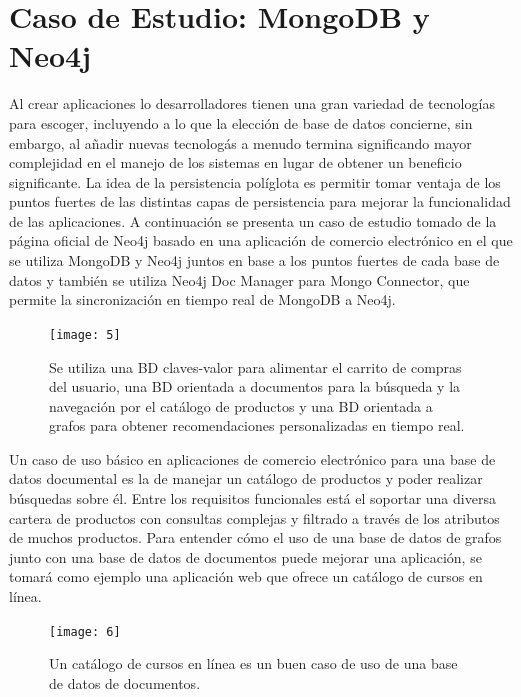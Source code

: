 \documentclass[conference]{IEEEtran}
\begin{document}
\section{Caso de Estudio: MongoDB y Neo4j}
Al crear aplicaciones lo desarrolladores tienen una gran variedad de tecnolog\'ias para escoger, incluyendo a lo que la elecci\'on de base de datos  concierne, sin embargo, al a\~nadir nuevas tecnolog\'as a menudo termina significando mayor complejidad en el manejo de los sistemas en lugar de obtener un beneficio significante. La idea de la persistencia pol\'iglota es permitir tomar ventaja de los puntos fuertes de las distintas capas de persistencia para mejorar la funcionalidad de las aplicaciones. A continuaci\'on se presenta un caso de estudio tomado de la p\'agina oficial de Neo4j \cite{caso} basado en una aplicaci\'on de comercio electr\'onico en el que se utiliza MongoDB y Neo4j juntos en base a los puntos fuertes de cada base de datos y tambi\'en se utiliza Neo4j Doc Manager para Mongo Connector, que permite la sincronizaci\'on en tiempo real de MongoDB a Neo4j.

\begin{figure}[!h]
\centering
\texttt{[image: 5]}
\caption{Se utiliza una BD claves-valor para alimentar el carrito de compras del usuario, una BD orientada a  documentos para la b\'usqueda y la navegaci\'on por el cat\'alogo de productos y una BD orientada a grafos para obtener recomendaciones personalizadas en tiempo real.}
\label{fig5}
\end{figure}

Un caso de uso b\'asico en aplicaciones de comercio electr\'onico para una base de datos documental es la de manejar un cat\'alogo de productos y poder realizar b\'usquedas sobre \'el. Entre los requisitos funcionales está el soportar una diversa cartera de productos con consultas complejas y filtrado a trav\'es de los atributos de muchos productos. Para entender c\'omo el uso de una base de datos de grafos  junto con una base de datos de documentos puede mejorar una aplicaci\'on, se tomar\'a como ejemplo una aplicaci\'on web que ofrece un cat\'alogo de cursos en l\'inea.

\begin{figure}[!h]
\centering
\texttt{[image: 6]}
\caption{Un cat\'alogo de cursos en l\'inea es un buen caso de uso de una base de datos de documentos.}
\label{fig6}
\end{figure}
\end{document}
